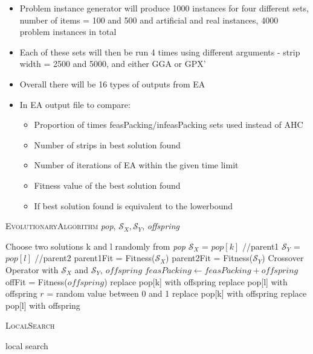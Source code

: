 \documentclass{elsarticle}
\begin{document}
\begin{itemize}
	\item Problem instance generator will produce 1000 instances for four different sets, number of items = 100 and 500 and artificial and real instances, 4000 problem instances in total
	\item Each of these sets will then be run 4 times using different arguments - strip width = 2500 and 5000, and either GGA or GPX'
	\item Overall there will be 16 types of outputs from EA
	
	\item In EA output file to compare:
	\begin{itemize}
		\item Proportion of times feasPacking/infeasPacking sets used instead of AHC
		\item Number of strips in best solution found
		\item Number of iterations of EA within the given time limit
		\item Fitness value of the best solution found
		\item If best solution found is equivalent to the lowerbound
	\end{itemize}	

\end{itemize}

\begin{algorithm}
\caption{\textsc{EvolutionaryAlgorithm} \textit{pop}, $\mathcal{S}_X, \mathcal{S}_Y$, \textit{offspring}}
\begin{algorithmic}
	\State Choose two solutions k and l randomly from \textit{pop}
	\State $\mathcal{S}_X$ = $pop[k]$ //parent1
	\State $\mathcal{S}_Y$ = $pop[l]$ //parent2
	\State parent1Fit = Fitness($\mathcal{S}_X$)
	\State parent2Fit = Fitness($\mathcal{S}_Y$)
	\Run Crossover Operator with $\mathcal{S}_X$ and $\mathcal{S}_Y$, \Output $offspring$
	\State $feasPacking \gets feasPacking + offspring$
	\State offFit = Fitness($offspring$)
		\State replace pop[k] with offspring
		\State replace pop[l] with offspring
		\State $r$ = random value between 0 and 1
			\State replace pop[k] with offspring
			\State replace pop[l] with offspring
		\EndIf		
	\EndIf	
\end{algorithmic}	
\end{algorithm}	

\begin{algorithm}
	\caption{\textsc{LocalSearch}}
	\begin{algorithmic}
		\State local search
	\end{algorithmic}	
\end{algorithm}
\end{document}
